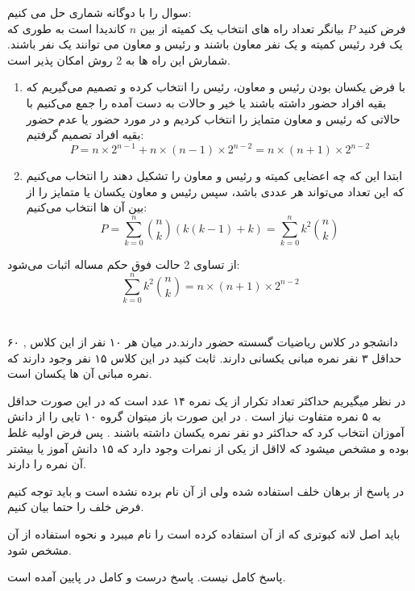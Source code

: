 \documentclass[11pt,largemargins]{h2wp}
\begin{document}
سوال را با دوگانه شماری حل می کنیم:\\
   فرض کنید $ P$ بیانگر تعداد راه های انتخاب یک کمیته از بین $n$ کاندیدا است به طوری که یک فرد رئیس کمیته و یک نفر معاون باشند و رئیس و معاون می توانند یک نفر باشند. شمارش این راه ها به 2 روش امکان پذیر است.
    \begin{enumerate}
        \item 
        با فرض یکسان بودن رئیس و معاون، رئیس را انتخاب کرده و تصمیم می‌گیریم که بقیه افراد حضور داشته باشند یا خیر و حالات به دست آمده را جمع می‌کنیم با حالاتی که رئیس و معاون متمایز را انتخاب کردیم و در مورد حضور یا عدم حضور بقیه افراد تصمیم گرفتیم:
        \[P = n\times{2^{n-1}} + n\times(n-1)\times{2^{n-2}} = n\times(n+1)\times{2^{n-2}}\]
        \item
        ابتدا این که چه اعضایی کمیته و رئیس و معاون را تشکیل دهند را انتخاب می‌کنیم که این تعداد می‌تواند هر عددی باشد، سپس رئیس و معاون یکسان یا متمایز را از بین آن ها انتخاب می‌کنیم:
        \[P = \displaystyle\sum_{k=0}^{n} {\binom{n}{k}(k(k-1)+k)} = \displaystyle\sum_{k=0}^{n} {{k^2}\binom{n}{k}}\]
    \end{enumerate}
    از تساوی 2 حالت فوق حکم مساله اثبات می‌شود:
    \[\displaystyle\sum_{k=0}^{n} {{k^2}\binom{n}{k}} = n\times(n+1)\times{2^{n-2}}\]
    \\ \\
    

\question
۶۰ دانشجو در کلاس ریاضیات گسسته حضور دارند.در میان هر ۱۰ نفر از این کلاس , حداقل ۳ نفر نمره مبانی یکسانی دارند. ثابت کنید در این کلاس ۱۵ نفر وجود دارند که نمره مبانی آن ها یکسان است.

\solution

در نظر میگیریم حداکثر تعداد تکرار از یک نمره ۱۴ عدد است که در این صورت حداقل به ۵ نمره متفاوت نیاز است . 
در این صورت باز میتوان گروه ۱۰ تایی را از دانش آموزان انتخاب کرد که حداکثر دو نفر نمره یکسان داشته باشند . پس فرض اولیه غلط بوده و مشخص میشود که لااقل از یکی از نمرات وجود دارد که ۱۵ دانش آموز یا بیشتر 
آن نمره را دارند.
 


\notes

در پاسخ از برهان خلف استفاده شده ولی از آن نام برده نشده است و باید توجه کنیم فرض خلف را حتما بیان کنیم.


باید اصل لانه   کبوتری که از آن استفاده کرده است را نام میبرد و نحوه استفاده از آن مشخص شود.


پاسخ کامل نیست. پاسخ درست و کامل در پایین آمده است.
\end{document}
